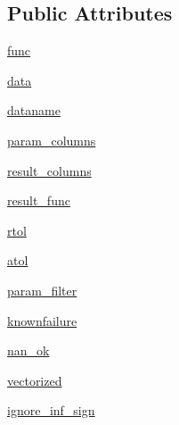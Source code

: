 \subsection*{Public Attributes}
\begin{DoxyCompactItemize}
\item 
\hyperlink{classscipy_1_1special_1_1__testutils_1_1FuncData_a9514238f05efefb00053933172cc03df}{func}
\item 
\hyperlink{classscipy_1_1special_1_1__testutils_1_1FuncData_a0a6b3a7c83479159654805bd0735ab98}{data}
\item 
\hyperlink{classscipy_1_1special_1_1__testutils_1_1FuncData_a118029497d6ace6dfffdc6d9f55510e2}{dataname}
\item 
\hyperlink{classscipy_1_1special_1_1__testutils_1_1FuncData_a6931858f0e70ce92aa4045c42c56f29f}{param\+\_\+columns}
\item 
\hyperlink{classscipy_1_1special_1_1__testutils_1_1FuncData_a37ff3e7de0befe61446902b5d82f819c}{result\+\_\+columns}
\item 
\hyperlink{classscipy_1_1special_1_1__testutils_1_1FuncData_afd71df1d8a45d6e9d730424b89b5a399}{result\+\_\+func}
\item 
\hyperlink{classscipy_1_1special_1_1__testutils_1_1FuncData_ab2e78968b9b5a66db6605f3515905510}{rtol}
\item 
\hyperlink{classscipy_1_1special_1_1__testutils_1_1FuncData_a70931261baebb60d0b0fa791dcad8745}{atol}
\item 
\hyperlink{classscipy_1_1special_1_1__testutils_1_1FuncData_ac35f9b766f3d21269cc13797c4331902}{param\+\_\+filter}
\item 
\hyperlink{classscipy_1_1special_1_1__testutils_1_1FuncData_a58bcc9d986b204bba9e21ae4a3a1d48a}{knownfailure}
\item 
\hyperlink{classscipy_1_1special_1_1__testutils_1_1FuncData_a22fea6cf9a3d43d86ea7805b19e9e05c}{nan\+\_\+ok}
\item 
\hyperlink{classscipy_1_1special_1_1__testutils_1_1FuncData_a15b7c53bd4d9894489163394d32efa14}{vectorized}
\item 
\hyperlink{classscipy_1_1special_1_1__testutils_1_1FuncData_a4805063db14f34f5b7c3d23bb247928c}{ignore\+\_\+inf\+\_\+sign}
\end{DoxyCompactItemize}



